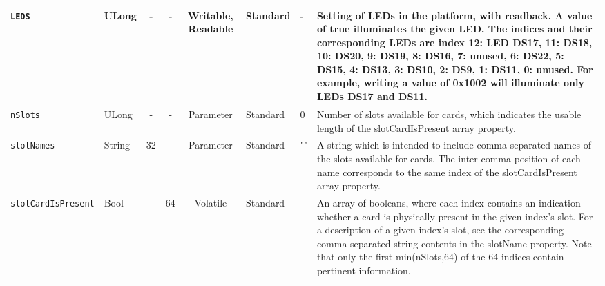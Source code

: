 \documentclass{article}
\begin{document}
\begin{landscape}
\begin{scriptsize}
\begin{tabular}{|p{3cm}|p{1.5cm}|c|c|c|p{1.5cm}|p{1cm}|p{6cm}|}
			\hline
			\verb+LEDS+        & ULong  & -              & -               & Writable, Readable & Standard    & -       & Setting of LEDs in the platform, with readback. A value of true illuminates the given LED. The indices and their corresponding LEDs are index 12: LED DS17, 11: DS18, 10: DS20, 9: DS19, 8: DS16, 7: unused, 6: DS22, 5: DS15, 4: DS13, 3: DS10, 2: DS9, 1: DS11, 0: unused. For example, writing a value of 0x1002 will illuminate only LEDs DS17 and DS11.\\
			\hline
			\verb+nSlots+      & ULong  & -              & -               & Parameter & Standard & 0 & Number of slots available for cards, which indicates the usable length of the slotCardIsPresent array property. \\
			\hline
			\verb+slotNames+   & String & 32             & -               & Parameter & Standard & "" & A string which is intended to include comma-separated names of the slots available for cards. The inter-comma position of each name corresponds to the same index of the slotCardIsPresent array property. \\
			\hline
			\verb+slotCardIsPresent+ & Bool & -          & 64              & Volatile           & Standard    & -       & An array of booleans, where each index contains an indication whether a card is physically present in the given index's slot. For a description of a given index's slot, see the corresponding comma-separated string contents in the slotName property. Note that only the first min(nSlots,64) of the 64 indices contain pertinent information. \\
			\hline

		\end{tabular}
	\end{scriptsize}

\end{landscape}
\end{document}
